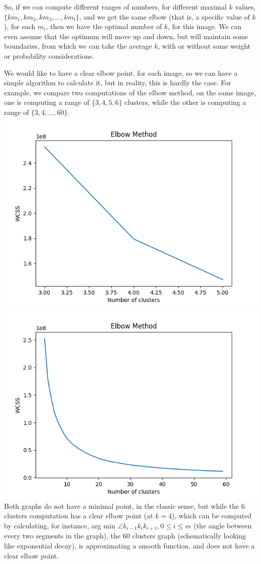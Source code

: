\documentclass[12pt]{article}
\begin{document}
So, if we can compute different ranges of numbers, for different maximal $k$ values, \( \{k{m_1},k{m_2},k{m_3},…,k{m_l} \} \), and we get the same elbow (that is, a specific value of $k$), for each \( m_i \), then we have the optimal number of $k$, for this image. We can even assume that the optimum will move up and down, but will maintain some boundaries, from which we can take the average $k$, with or without some weight or probability considerations. \newline

We would like to have a clear elbow point, for each image, so we can have a simple algorithm to calculate it, \newline
but in reality, this is hardly the case. For example, we compare two computations of the elbow method, on the same image, \newline
one is computing a range of $\{3,4,5,6\}$ clusters, while the other is computing a range of $\{3,4,...,60\}$. \newline
\includegraphics[width=0.50\columnwidth]{Figure_6.png}
\includegraphics[width=0.50\columnwidth]{Figure_60.png} \newline
Both graphs do not have a minimal point, in the classic sense,
but while the 6 clusters computation has a clear elbow point (at $k=4$), \newline
which can be computed by calculating, for instance, \newline
arg min $\angle k_{i-1}k_{i}k_{i+1},0 \leq i \leq m$ (the angle between every two segments in the graph),
the 60 clusters graph (schematically looking like exponential decay), \newline
is approximating a smooth function, and does not have a clear elbow point. \newline
\end{document}
